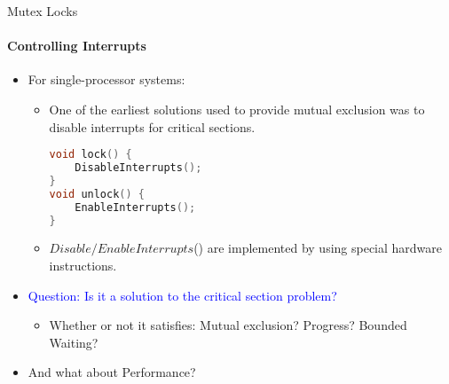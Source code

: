 \documentclass[10pt]{beamer}
\begin{document}
\begin{frame}[fragile]{Mutex Locks}
\framesubtitle{Controlling Interrupts}
\begin{itemize}
\item For single-processor systems:
\begin{itemize}
\item One of the earliest solutions used to provide mutual exclusion was to disable interrupts for critical sections.
\vspace{6pt}\\
\begin{uncoverenv}
\begin{lstlisting}[language=C]
void lock() {
	DisableInterrupts();
}
void unlock() {
	EnableInterrupts();
}
\end{lstlisting}
\end{uncoverenv}
\item $Disable/EnableInterrupts$() are implemented by using special hardware instructions.
\end{itemize}
\item \textcolor{blue}{Question: Is it a solution to the critical section problem?}
\begin{itemize}
\item Whether or not it satisfies: Mutual exclusion? Progress? Bounded Waiting?
\end{itemize}
\item And what about Performance?
\end{itemize}
\end{frame}
\end{document}

